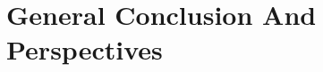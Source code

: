 

\chapter{General Conclusion And Perspectives}

\ifpdf
    \graphicspath{{Chapter3/Figs/Raster/}{Chapter3/Figs/PDF/}{Chapter3/Figs/}}
\else
    \graphicspath{{Chapter3/Figs/Vector/}{Chapter3/Figs/}}
\fi

